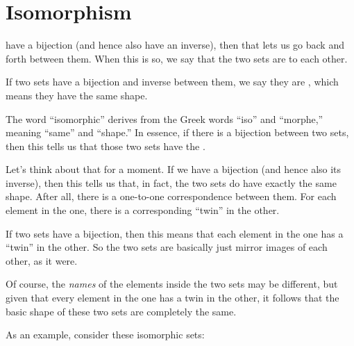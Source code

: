 \documentclass[../../../main.tex]{subfiles}
\begin{document}
\section{Isomorphism}

 have a bijection (and hence also have an inverse), then that lets us go back and forth between them. When this is so, we say that the two sets are  to each other. 

\begin{terminology}
  If two sets have a bijection and inverse between them, we say they are , which means they have the same shape.
\end{terminology}

The word ``isomorphic'' derives from the Greek words ``iso'' and ``morphe,'' meaning ``same'' and ``shape.'' In essence, if there is a bijection between two sets, then this tells us that those two sets have the . 

Let's think about that for a moment. If we have a bijection (and hence also its inverse), then this tells us that, in fact, the two sets do have exactly the same shape. After all, there is a one-to-one correspondence between them. For each element in the one, there is a corresponding ``twin'' in the other. 

\begin{aside}
  \begin{remark}
    If two sets have a bijection, then this means that each element in the one has a ``twin'' in the other. So the two sets are basically just mirror images of each other, as it were.
  \end{remark}
\end{aside}

Of course, the \emph{names} of the elements inside the two sets may be different, but given that every element in the one has a twin in the other, it follows that the basic shape of these two sets are completely the same.

As an example, consider these isomorphic sets:
\end{document}

